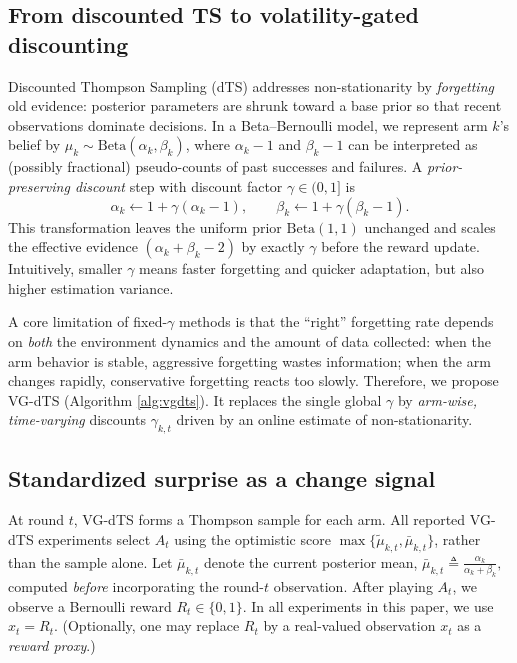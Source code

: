 \documentclass{article}
\begin{document}
\subsection{From discounted TS to volatility-gated discounting}
Discounted Thompson Sampling (dTS) \cite{raj2017taming} addresses non-stationarity by \emph{forgetting} old evidence: posterior parameters are shrunk toward a base prior so that recent observations dominate decisions.
In a Beta--Bernoulli model, we represent arm $k$'s belief by $\mu_{k}\sim \mathrm{Beta}(\alpha_k,\beta_k)$, where $\alpha_k-1$ and $\beta_k-1$ can be interpreted as (possibly fractional) pseudo-counts of past successes and failures.
A \emph{prior-preserving discount} step with discount factor $\gamma\in(0,1]$ is
\begin{equation}
\alpha_k \leftarrow 1+\gamma(\alpha_k-1),\qquad
\beta_k \leftarrow 1+\gamma(\beta_k-1).
\label{eq:prior_preserving_discount}
\end{equation}
This transformation leaves the uniform prior $\mathrm{Beta}(1,1)$ unchanged and scales the effective evidence $(\alpha_k+\beta_k-2)$ by exactly $\gamma$ before the reward update.
Intuitively, smaller $\gamma$ means faster forgetting and quicker adaptation, but also higher estimation variance.

A core limitation of fixed-$\gamma$ methods is that the ``right'' forgetting rate depends on \emph{both} the environment dynamics and the amount of data collected:
when the arm behavior is stable, aggressive forgetting wastes information; when the arm changes rapidly, conservative forgetting reacts too slowly.
Therefore, we propose VG-dTS (Algorithm \ref{alg:vgdts}). It replaces the single global $\gamma$ by \emph{arm-wise, time-varying} discounts $\gamma_{k,t}$ driven by an online estimate of non-stationarity.

\subsection{Standardized surprise as a change signal}
At round $t$, VG-dTS forms a Thompson sample for each arm. All reported VG-dTS experiments select $A_t$ using the optimistic score $\max\{\widetilde{\mu}_{k,t},\bar{\mu}_{k,t}\}$, rather than the sample alone.
Let $\bar{\mu}_{k,t}$ denote the current posterior mean,
$
\bar{\mu}_{k,t} \triangleq \frac{\alpha_k}{\alpha_k+\beta_k},
$
computed \emph{before} incorporating the round-$t$ observation.
After playing $A_t$, we observe a Bernoulli reward $R_t\in\{0,1\}$.
In all experiments in this paper, we use $x_t=R_t$.
(Optionally, one may replace $R_t$ by a real-valued observation $x_t$ as a \emph{reward proxy}.)
\end{document}
